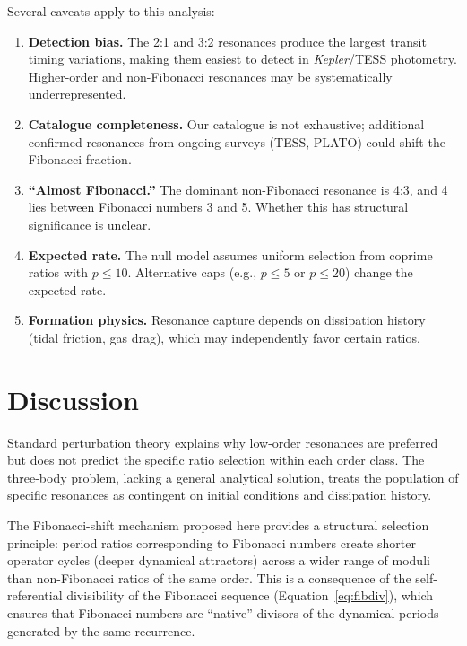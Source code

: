 \documentclass[twocolumn,11pt]{article}
\begin{document}
Several caveats apply to this analysis:

\begin{enumerate}
\item \textbf{Detection bias.}  The 2:1 and 3:2 resonances produce
the largest transit timing variations, making them easiest to detect
in \emph{Kepler}/TESS photometry.  Higher-order and non-Fibonacci
resonances may be systematically underrepresented.

\item \textbf{Catalogue completeness.}  Our catalogue is not
exhaustive; additional confirmed resonances from ongoing surveys
(TESS, PLATO) could shift the Fibonacci fraction.

\item \textbf{``Almost Fibonacci.''} The dominant non-Fibonacci
resonance is 4:3, and 4 lies between Fibonacci numbers 3 and 5.
Whether this has structural significance is unclear.

\item \textbf{Expected rate.}  The null model assumes uniform
selection from coprime ratios with $p \leq 10$.  Alternative caps
(e.g., $p \leq 5$ or $p \leq 20$) change the expected rate.

\item \textbf{Formation physics.}  Resonance capture depends on
dissipation history (tidal friction, gas drag), which may
independently favor certain ratios.
\end{enumerate}

\section{Discussion}
\label{sec:discussion}

Standard perturbation theory explains why low-order resonances are
preferred \citep{murray1999} but does not predict the specific ratio
selection within each order class.  The three-body problem, lacking a
general analytical solution, treats the population of specific
resonances as contingent on initial conditions and dissipation
history.

The Fibonacci-shift mechanism proposed here provides a structural
selection principle: period ratios corresponding to Fibonacci numbers
create shorter operator cycles (deeper dynamical attractors) across a
wider range of moduli than non-Fibonacci ratios of the same order.
This is a consequence of the self-referential divisibility of the
Fibonacci sequence (Equation~\ref{eq:fibdiv}), which ensures that
Fibonacci numbers are ``native'' divisors of the dynamical periods
generated by the same recurrence.
\end{document}
